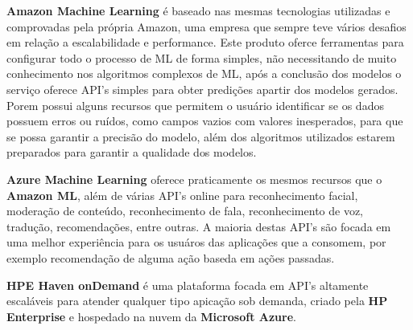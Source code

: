 \begin{alineas}
	\item \textbf{Amazon Machine Learning} é baseado nas mesmas tecnologias utilizadas e comprovadas pela própria Amazon, uma empresa que sempre teve vários
	desafios em relação a escalabilidade e performance. Este produto oferce ferramentas para configurar todo o processo de ML de forma simples, não necessitando 
	de muito conhecimento nos algoritmos complexos de ML, após a conclusão dos modelos o serviço oferece API's simples para obter predições apartir dos modelos gerados.
	Porem possui alguns recursos que permitem o usuário identificar se os dados possuem erros ou ruídos, como campos vazios com valores inesperados, para que se possa 
	garantir a precisão do modelo, além dos algoritmos utilizados estarem preparados para garantir a qualidade dos modelos.       
	
	\item \textbf{Azure Machine Learning} oferece praticamente os mesmos recursos que o \textbf{Amazon ML}, 
	além de várias API's online para reconhecimento	facial, moderação de conteúdo, reconhecimento de fala, reconhecimento de voz, tradução, recomendações, entre outras. 
	A maioria destas API's são focada em uma melhor experiência para os usuáros das aplicações que a consomem, por exemplo  recomendação de alguma ação baseda em 
	ações passadas.

	\item \textbf{HPE Haven onDemand} é uma plataforma focada em API's altamente escaláveis para atender qualquer tipo apicação sob demanda,
	 criado pela \textbf{HP Enterprise} e hospedado na nuvem da \textbf{Microsoft Azure}.    	
\end{alineas}








